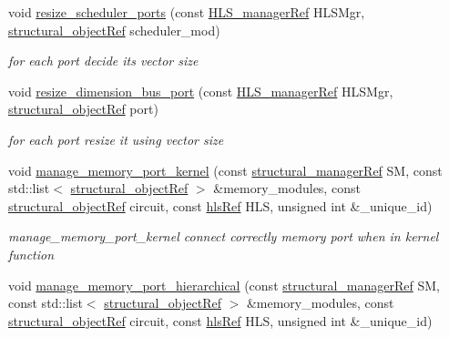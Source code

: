 \begin{DoxyCompactItemize}
void \hyperlink{classfu__binding__cs_a747378042d84416750cd1835d80aaa13}{resize\+\_\+scheduler\+\_\+ports} (const \hyperlink{hls__manager_8hpp_acd3842b8589fe52c08fc0b2fcc813bfe}{H\+L\+S\+\_\+manager\+Ref} H\+L\+S\+Mgr, \hyperlink{structural__objects_8hpp_a8ea5f8cc50ab8f4c31e2751074ff60b2}{structural\+\_\+object\+Ref} scheduler\+\_\+mod)
\begin{DoxyCompactList}\small\item\em for each port decide its vector size \end{DoxyCompactList}\item 
void \hyperlink{classfu__binding__cs_a2858be239990d67661b459950778380d}{resize\+\_\+dimension\+\_\+bus\+\_\+port} (const \hyperlink{hls__manager_8hpp_acd3842b8589fe52c08fc0b2fcc813bfe}{H\+L\+S\+\_\+manager\+Ref} H\+L\+S\+Mgr, \hyperlink{structural__objects_8hpp_a8ea5f8cc50ab8f4c31e2751074ff60b2}{structural\+\_\+object\+Ref} port)
\begin{DoxyCompactList}\small\item\em for each port resize it using vector size \end{DoxyCompactList}\item 
void \hyperlink{classfu__binding__cs_a96110f5b42db5729356de61f5824bdce}{manage\+\_\+memory\+\_\+port\+\_\+kernel} (const \hyperlink{structural__manager_8hpp_ab3136f0e785d8535f8d252a7b53db5b5}{structural\+\_\+manager\+Ref} SM, const std\+::list$<$ \hyperlink{structural__objects_8hpp_a8ea5f8cc50ab8f4c31e2751074ff60b2}{structural\+\_\+object\+Ref} $>$ \&memory\+\_\+modules, const \hyperlink{structural__objects_8hpp_a8ea5f8cc50ab8f4c31e2751074ff60b2}{structural\+\_\+object\+Ref} circuit, const \hyperlink{hls_8hpp_a75d0c73923d0ddfa28c4843a802c73a7}{hls\+Ref} H\+LS, unsigned int \&\+\_\+unique\+\_\+id)
\begin{DoxyCompactList}\small\item\em manage\+\_\+memory\+\_\+port\+\_\+kernel connect correctly memory port when in kernel function \end{DoxyCompactList}\item 
void \hyperlink{classfu__binding__cs_afaba387982e2d00b6269055728c53cfd}{manage\+\_\+memory\+\_\+port\+\_\+hierarchical} (const \hyperlink{structural__manager_8hpp_ab3136f0e785d8535f8d252a7b53db5b5}{structural\+\_\+manager\+Ref} SM, const std\+::list$<$ \hyperlink{structural__objects_8hpp_a8ea5f8cc50ab8f4c31e2751074ff60b2}{structural\+\_\+object\+Ref} $>$ \&memory\+\_\+modules, const \hyperlink{structural__objects_8hpp_a8ea5f8cc50ab8f4c31e2751074ff60b2}{structural\+\_\+object\+Ref} circuit, const \hyperlink{hls_8hpp_a75d0c73923d0ddfa28c4843a802c73a7}{hls\+Ref} H\+LS, unsigned int \&\+\_\+unique\+\_\+id)

\end{DoxyCompactItemize}
